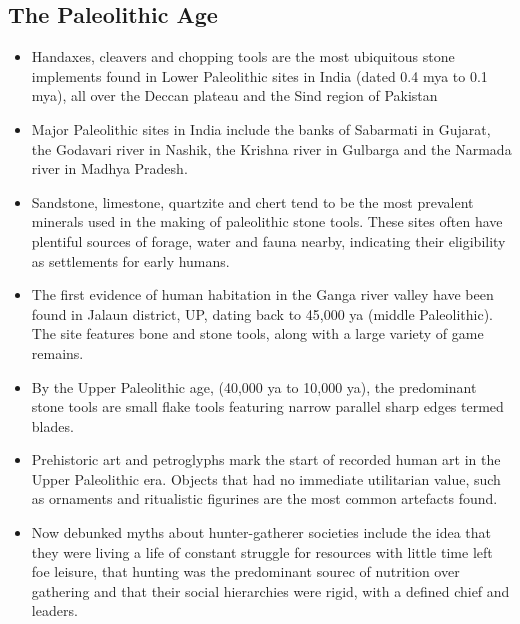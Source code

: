 \subsection{The Paleolithic Age}
\begin{itemize}
    \item Handaxes, cleavers and chopping tools are the most ubiquitous stone implements found in Lower Paleolithic sites in India (dated 0.4 mya to 0.1 mya), all over the Deccan plateau and the Sind region of Pakistan
    \item Major Paleolithic sites in India include the banks of Sabarmati in Gujarat, the Godavari river in Nashik, the Krishna river in Gulbarga and the Narmada river in Madhya Pradesh.
    \item Sandstone, limestone, quartzite and chert tend to be the most prevalent minerals used in the making of paleolithic stone tools. These sites often have plentiful sources of forage, water and fauna nearby, indicating their eligibility as settlements for early humans.
    \item The first evidence of human habitation in the Ganga river valley have been found in Jalaun district, UP, dating back to 45,000 ya (middle Paleolithic). The site features bone and stone tools, along with a large variety of game remains.
    \item By the Upper Paleolithic age, (40,000 ya to 10,000 ya), the predominant stone tools are small flake tools featuring narrow parallel sharp edges termed blades.
    \item Prehistoric art and \Gls{petroglyphs} mark the start of recorded human art in the Upper Paleolithic era. Objects that had no immediate utilitarian value, such as ornaments and ritualistic figurines are the most common artefacts found.
    \item Now debunked myths about hunter-gatherer societies include the idea that they were living a life of constant struggle for resources with little time left foe leisure, that hunting was the predominant sourec of nutrition over gathering and that their social hierarchies were rigid, with a defined chief and leaders.
\end{itemize}


